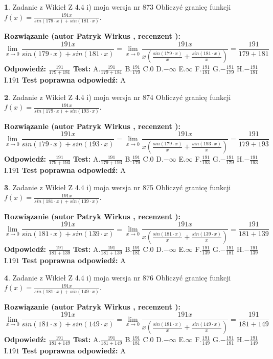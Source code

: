\documentclass[12pt, a4paper]{article}
\theoremstyle{definition} %
\newtheorem{zad}{}
\newcommand{\zadStart}[1]{\begin{zad}#1\newline}
\newcommand{\zadStop}{\end{zad}}
\newcommand{\rozwStart}[2]{\noindent \textbf{Rozwiązanie (autor #1 , recenzent #2): }\newline}
\newcommand{\rozwStop}{\newline}
\newcommand{\odpStart}{\noindent \textbf{Odpowiedź:}\newline}
\newcommand{\odpStop}{\newline}
\newcommand{\testStart}{\noindent \textbf{Test:}\newline}
\newcommand{\testStop}{\newline}
\newcommand{\kluczStart}{\noindent \textbf{Test poprawna odpowiedź:}\newline}
\newcommand{\kluczStop}{\newline}
\begin{document}
\zadStart{Zadanie z Wikieł Z 4.4 i) moja wersja nr 873}
Obliczyć granicę funkcji $f(x)=\frac{191x}{sin(179\cdot x) +sin(181\cdot x)}$.
\zadStop
\rozwStart{Patryk Wirkus}{}
$$\lim\limits_{x\to 0}\frac{191x}{sin(179\cdot x) +sin(181\cdot x)}=\lim\limits_{x\to 0}\frac{191x}{x(\frac{sin(179\cdot x)}{x}+\frac{sin(181\cdot x)}{x})}=\frac{191}{179+181}$$
\rozwStop
\odpStart
$\frac{191}{179+181}$
\odpStop
\testStart
A.$\frac{191}{179+181}$
B.$\frac{191}{179}$
C.$0$
D.$-\infty$
E.$\infty$
F.$\frac{191}{181}$
G.$-\frac{191}{179}$
H.$-\frac{191}{181}$
I.$191$
\testStop
\kluczStart
A
\kluczStop



\zadStart{Zadanie z Wikieł Z 4.4 i) moja wersja nr 874}
Obliczyć granicę funkcji $f(x)=\frac{191x}{sin(179\cdot x) +sin(193\cdot x)}$.
\zadStop
\rozwStart{Patryk Wirkus}{}
$$\lim\limits_{x\to 0}\frac{191x}{sin(179\cdot x) +sin(193\cdot x)}=\lim\limits_{x\to 0}\frac{191x}{x(\frac{sin(179\cdot x)}{x}+\frac{sin(193\cdot x)}{x})}=\frac{191}{179+193}$$
\rozwStop
\odpStart
$\frac{191}{179+193}$
\odpStop
\testStart
A.$\frac{191}{179+193}$
B.$\frac{191}{179}$
C.$0$
D.$-\infty$
E.$\infty$
F.$\frac{191}{193}$
G.$-\frac{191}{179}$
H.$-\frac{191}{193}$
I.$191$
\testStop
\kluczStart
A
\kluczStop



\zadStart{Zadanie z Wikieł Z 4.4 i) moja wersja nr 875}
Obliczyć granicę funkcji $f(x)=\frac{191x}{sin(181\cdot x) +sin(139\cdot x)}$.
\zadStop
\rozwStart{Patryk Wirkus}{}
$$\lim\limits_{x\to 0}\frac{191x}{sin(181\cdot x) +sin(139\cdot x)}=\lim\limits_{x\to 0}\frac{191x}{x(\frac{sin(181\cdot x)}{x}+\frac{sin(139\cdot x)}{x})}=\frac{191}{181+139}$$
\rozwStop
\odpStart
$\frac{191}{181+139}$
\odpStop
\testStart
A.$\frac{191}{181+139}$
B.$\frac{191}{181}$
C.$0$
D.$-\infty$
E.$\infty$
F.$\frac{191}{139}$
G.$-\frac{191}{181}$
H.$-\frac{191}{139}$
I.$191$
\testStop
\kluczStart
A
\kluczStop



\zadStart{Zadanie z Wikieł Z 4.4 i) moja wersja nr 876}
Obliczyć granicę funkcji $f(x)=\frac{191x}{sin(181\cdot x) +sin(149\cdot x)}$.
\zadStop
\rozwStart{Patryk Wirkus}{}
$$\lim\limits_{x\to 0}\frac{191x}{sin(181\cdot x) +sin(149\cdot x)}=\lim\limits_{x\to 0}\frac{191x}{x(\frac{sin(181\cdot x)}{x}+\frac{sin(149\cdot x)}{x})}=\frac{191}{181+149}$$
\rozwStop
\odpStart
$\frac{191}{181+149}$
\odpStop
\testStart
A.$\frac{191}{181+149}$
B.$\frac{191}{181}$
C.$0$
D.$-\infty$
E.$\infty$
F.$\frac{191}{149}$
G.$-\frac{191}{181}$
H.$-\frac{191}{149}$
I.$191$
\testStop
\kluczStart
A
\kluczStop
\end{document}
